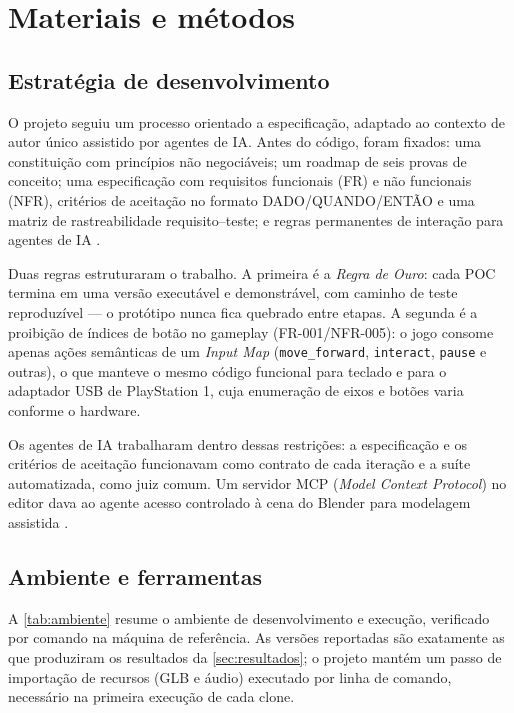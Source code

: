 \section{Materiais e métodos}
\label{sec:metodologia}

\subsection{Estratégia de desenvolvimento}

O projeto seguiu um processo orientado a especificação, adaptado ao contexto de
autor único assistido por agentes de IA. Antes do código, foram fixados: uma
constituição com princípios não negociáveis; um roadmap de seis provas de
conceito; uma especificação com requisitos funcionais (FR) e não funcionais
(NFR), critérios de aceitação no formato DADO\slash QUANDO\slash ENTÃO e uma matriz de
rastreabilidade requisito--teste; e regras permanentes de interação para
agentes de IA \citep{lab404repo}.

Duas regras estruturaram o trabalho. A primeira é a \emph{Regra de Ouro}: cada
POC termina em uma versão executável e demonstrável, com caminho de teste
reproduzível --- o protótipo nunca fica quebrado entre etapas. A segunda é a
proibição de índices de botão no gameplay (FR-001/NFR-005): o jogo consome
apenas ações semânticas de um \emph{Input Map} (\texttt{move\_forward},
\texttt{interact}, \texttt{pause} e outras), o que manteve o mesmo código
funcional para teclado e para o adaptador USB de PlayStation 1, cuja
enumeração de eixos e botões varia conforme o hardware.

Os agentes de IA trabalharam dentro dessas restrições: a especificação e os
critérios de aceitação funcionavam como contrato de cada iteração e a suíte
automatizada, como juiz comum. Um servidor MCP (\emph{Model Context Protocol})
no editor dava ao agente acesso controlado à cena do Blender para modelagem
assistida \citep{lab404repo}.

\subsection{Ambiente e ferramentas}

A \autoref{tab:ambiente} resume o ambiente de desenvolvimento e execução,
verificado por comando na máquina de referência. As versões reportadas são
exatamente as que produziram os resultados da \autoref{sec:resultados}; o
projeto mantém um passo de importação de recursos (GLB e áudio) executado por
linha de comando, necessário na primeira execução de cada clone.

